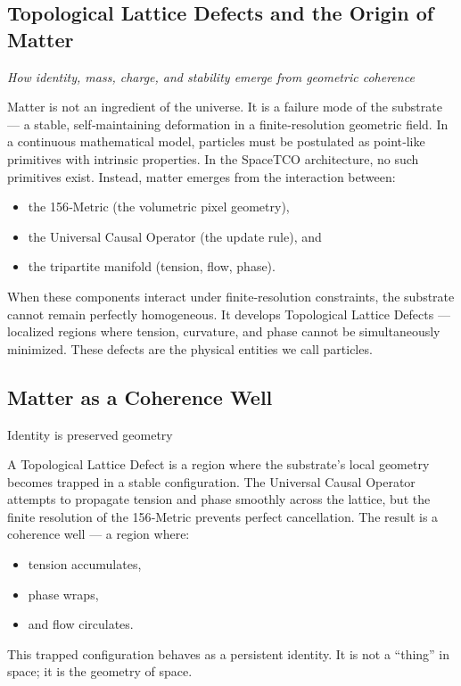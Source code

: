 \documentclass[reprint,amsmath,amssymb,aps,prl,floatfix]{revtex4-2}
\begin{document}
\begin{itemize}
\section{Topological Lattice Defects and the Origin of Matter}
\textit{How identity, mass, charge, and stability emerge from geometric coherence}

Matter is not an ingredient of the universe.  
It is a failure mode of the substrate — a stable, self‑maintaining deformation in a finite‑resolution geometric field. In a continuous mathematical model, particles must be postulated as point‑like primitives with intrinsic properties. In the SpaceTCO architecture, no such primitives exist. Instead, matter emerges from the interaction between:
\begin{itemize}
\item the 156‑Metric (the volumetric pixel geometry),  
\item the Universal Causal Operator (the update rule), and  
\item the tripartite manifold (tension, flow, phase).
\end{itemize}

When these components interact under finite‑resolution constraints, the substrate cannot remain perfectly homogeneous. It develops Topological Lattice Defects — localized regions where tension, curvature, and phase cannot be simultaneously minimized. These defects are the physical entities we call particles.

\subsection{Matter as a Coherence Well}

Identity is preserved geometry

A Topological Lattice Defect is a region where the substrate’s local geometry becomes trapped in a stable configuration. The Universal Causal Operator attempts to propagate tension and phase smoothly across the lattice, but the finite resolution of the 156‑Metric prevents perfect cancellation. The result is a coherence well — a region where:
\begin{itemize}
\item tension accumulates,  
\item phase wraps,  
\item and flow circulates.
\end{itemize}

This trapped configuration behaves as a persistent identity.  
It is not a “thing” in space; it is the geometry of space.


\end{itemize}
\end{document}
